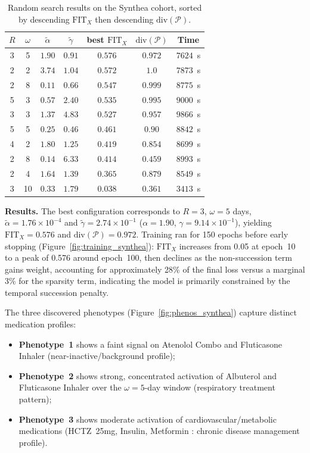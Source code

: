 \documentclass[a4paper]{cas-sc}
\begin{document}
\begin{table}[htbp]
\centering
\caption{Random search results on the Synthea cohort, sorted by descending $\text{FIT}_X$ then descending $\text{div}(\mathcal{P})$.}
\label{tab:results_synthea}
\begin{tabular}{ccccccc}
\toprule
$R$ & $\omega$ & $\tilde{\alpha}$ & $\tilde{\gamma}$ & best $\text{FIT}_X$ & $\text{div}(\mathcal{P})$ & Time \\
\midrule
3 & 5 & $1.90$ & $0.91$ & $0.576$ & $0.972$ & $7 624$~s \\
2 & 2 & $3.74$ & $1.04$ & $0.572$ & $1.0$ & $7 873$~s \\
2 & 8 & $0.11$ & $0.66$ & $0.547$ & $0.999$ & $8 775$~s \\
5 & 3 & $0.57$ & $2.40$ & $0.535$ & $0.995$ & $9 000$~s \\
3 & 3 & $1.37$ & $4.83$ & $0.527$ & $0.957$ & $9 866$~s \\
5 & 5 & $0.25$ & $0.46$ & $0.461$ & $0.90$ & $8 842$~s \\
4 & 2 & $1.80$ & $1.25$ & $0.419$ & $0.854$ & $8 699$~s \\
2 & 8 & $0.14$ & $6.33$ & $0.414$ & $0.459$ & $8 993$~s \\
2 & 4 & $1.64$ & $1.39$ & $0.365$ & $0.879$ & $8 549$~s \\
3 & 10 & $0.33$ & $1.79$ & $0.038$ & $0.361$ & $3 413$~s \\
\bottomrule
\end{tabular}
\end{table}

\textbf{Results.}
The best configuration corresponds to $R = 3$, $\omega = 5$ days, $\tilde{\alpha} = 1.76 \times 10^{-4}$ and $\tilde{\gamma} = 2.74 \times 10^{-1}$ ($\alpha = 1.90$, $\gamma = 9.14 \times 10^{-1}$), yielding $\text{FIT}_X = 0.576$ and $\text{div}(\mathcal{P}) = 0.972$. 
Training ran for 150 epochs before early stopping (Figure~\ref{fig:training_synthea}): $\text{FIT}_X$ increases from 0.05 at epoch~10 to a peak of 0.576 around epoch~100, then declines as the non-succession term gains weight, accounting for approximately 28\% of the final loss versus a marginal 3\% for the sparsity term, indicating the model is primarily constrained by the temporal succession penalty.
 
The three discovered phenotypes (Figure~\ref{fig:phenos_synthea}) capture distinct medication profiles: 
\begin{itemize}
  \item \textbf{Phenotype~1} shows a faint signal on Atenolol Combo and Fluticasone Inhaler (near-inactive/background profile); 
  \item \textbf{Phenotype~2} shows strong, concentrated activation of Albuterol and Fluticasone Inhaler over the $\omega = 5$-day window (respiratory treatment pattern); 
  \item \textbf{Phenotype~3} shows moderate activation of cardiovascular/metabolic medications (HCTZ~25mg, Insulin, Metformin : chronic disease management profile).
\end{itemize}
\end{document}
